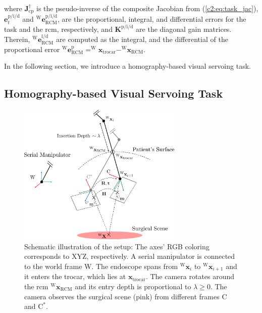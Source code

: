 where $\mathbf{J}_\text{cp}^{\dagger}$ is the pseudo-inverse of the composite Jacobian from (\eqref{c2:eq:task_jac}), $\mathbf{e}^{\text{p}/\text{i}/\text{d}}_t$ and $^\text{W}\mathbf{e}^{\text{p}/\text{i}/\text{d}}_\text{RCM}$, are the proportional, integral, and differential errors for the task and the \gls{rcm}, respectively, and $\mathbf{K}^{\text{p}/\text{i}/\text{d}}$ are the diagonal gain matrices. Therein, $^\text{W}\mathbf{e}_\text{RCM}^{\text{i}/\text{d}}$ are computed as the integral, and the differential of the proportional error $^\text{W}\mathbf{e}_\text{RCM}^\text{p} = ^\text{W}\mathbf{x}_\text{trocar} - ^\text{W}\mathbf{x}_\text{RCM}$. 

In the following section, we introduce a homography-based visual servoing task.

\subsection{Homography-based Visual Servoing Task}
\label{c2:sec:homography_task}

\begin{figure}[tb]
\centering
\includegraphics[width=0.7\textwidth]{img/h_rcm_vs_fig.pdf}
\caption{Schematic illustration of the setup: The axes' RGB coloring corresponds to XYZ, respectively. A serial manipulator is connected to the world frame W. The endoscope spans from $^\text{W}\mathbf{x}_i$ to $^\text{W}\mathbf{x}_{i+1}$ and it enters the trocar, which lies at $\mathbf{x}_\text{trocar}$. The camera rotates around the \gls{rcm} $^\text{W}\mathbf{x}_\text{RCM}$ and its entry depth is proportional to $\lambda \geq 0$.  The camera observes the surgical scene (pink) from different frames $\text{C}$ and $\text{C}^*$.}
\label{c2:fig:schematic}
\end{figure}

